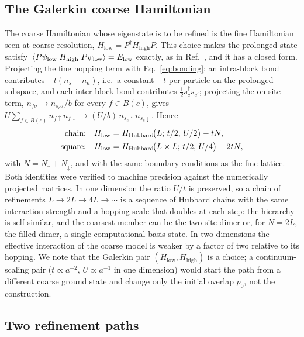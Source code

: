 \documentclass[
  aps,
  prc,
  reprint,
  superscriptaddress,
  floatfix,
  nofootinbib
]{revtex4-2}
\newcommand{\Hlow}{H_{\mathrm{low}}}
\newcommand{\Hhigh}{H_{\mathrm{high}}}
\begin{document}
\subsection{The Galerkin coarse Hamiltonian}
\label{sec:galerkin}
The coarse Hamiltonian whose eigenstate is to be refined is the fine
Hamiltonian seen at coarse resolution, $\Hlow=P^\dagger\Hhigh P$.  This
choice makes the prolonged state satisfy $\expval{\Hhigh}{P\psi_{\rm low}}
=E_{\rm low}$ exactly, as in Ref.~\cite{EigenQPairing2026}, and it has a
closed form.  Projecting the fine hopping term with Eq.~\eqref{eq:bonding}:
an intra-block bond contributes $-t(n_s-n_a)$, i.e.\ a constant $-t$ per
particle on the prolonged subspace, and each inter-block bond contributes
$\tfrac12 s^\dagger_c s_{c'}$; projecting the on-site term,
$n_{f\sigma}\to n_{s_c\sigma}/b$ for every $f\in B(c)$, gives
$U\sum_{f\in B(c)}n_{f\uparrow}n_{f\downarrow}\to(U/b)\,n_{s_c\uparrow}n_{s_c\downarrow}$.
Hence
\begin{align}
  \text{chain:}\quad &\Hlow=H_{\rm Hubbard}\!\big(L;\,t/2,\,U/2\big)-tN, \label{eq:gal1d}\\
  \text{square:}\quad&\Hlow=H_{\rm Hubbard}\!\big(L\times L;\,t/2,\,U/4\big)-2tN, \label{eq:gal2d}
\end{align}
with $N=N_\uparrow+N_\downarrow$, and with the same boundary conditions as the
fine lattice.  Both identities were verified to machine precision against
the numerically projected matrices.  In one dimension the ratio $U/t$ is
preserved, so a chain of refinements $L\to2L\to4L\to\cdots$ is a sequence
of Hubbard chains with the same interaction strength and a hopping scale
that doubles at each step: the hierarchy is self-similar, and the coarsest
member can be the two-site dimer or, for $N=2L$, the filled dimer, a single
computational basis state.  In two dimensions the effective interaction of
the coarse model is weaker by a factor of two relative to its hopping.  We
note that the Galerkin pair $(\Hlow,\Hhigh)$ is a choice; a continuum-scaling
pair ($t\propto a^{-2}$, $U\propto a^{-1}$ in one dimension) would start the
path from a different coarse ground state and change only the initial
overlap $p_0$, not the construction.

\subsection{Two refinement paths}
\label{sec:paths}
\end{document}
